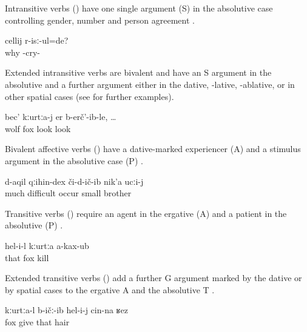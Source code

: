 Intransitive verbs () have one single argument (S) in the absolutive case controlling gender, number and person agreement .

\begin{exe}
	\ex	\label{ex:She is crying.Why}
	\gll	cellij r-isː-ul=de?	\\
		why -cry- 	\\
	\glt	{}
\end{exe}

Extended intransitive verbs are bivalent and have an S argument in the absolutive and a further argument either in the dative, -lative, -ablative, or in other spatial cases  (see  for further examples).
%
\begin{exe}
	\ex	\label{ex:The wolf looked at the fox}
	\gll	bec'	kːurtːa-j er	b-erč'-ib-le, \ldots	\\
		wolf	fox look	look	\\
	\glt	{}
\end{exe}

Bivalent affective verbs () have a dative-marked experiencer (A) and a stimulus argument in the absolutive case (P) .
%
\begin{exe}
	\ex	\label{ex:‎‎‎The little brother experienced many difficulties}
	\gll	d-aqil	qːihin-dex	či-d-ič-ib	nik'a	ucːi-j\\
		much	difficult	occur	small	brother\\
	\glt	{}
\end{exe}

Transitive verbs () require an agent in the ergative (A) and a patient in the absolutive (P) . 
%
\begin{exe}
	\ex	\label{ex:He did not kill the fox}
	\gll	hel-i-l	kːurtːa a-kax-ub\\
		that	fox kill\\
	\glt	{}
\end{exe}

Extended transitive verbs () add a further G argument marked by the dative or by spatial cases to the ergative A and the absolutive T .
%
\begin{exe}
	\ex	\label{ex:The fox gave him his hair}
	\gll	kːurtːa-l	b-ičː-ib	hel-i-j	cin-na	ʁez\\
		fox	give	that		hair\\
	\glt	{}
\end{exe}

